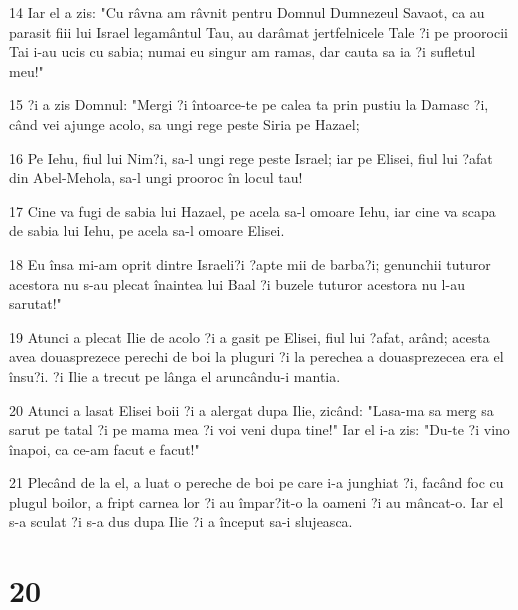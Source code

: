 \par 14 Iar el a zis: "Cu râvna am râvnit pentru Domnul Dumnezeul Savaot, ca au parasit fiii lui Israel legamântul Tau, au darâmat jertfelnicele Tale ?i pe proorocii Tai i-au ucis cu sabia; numai eu singur am ramas, dar cauta sa ia ?i sufletul meu!"
\par 15 ?i a zis Domnul: "Mergi ?i întoarce-te pe calea ta prin pustiu la Damasc ?i, când vei ajunge acolo, sa ungi rege peste Siria pe Hazael;
\par 16 Pe Iehu, fiul lui Nim?i, sa-l ungi rege peste Israel; iar pe Elisei, fiul lui ?afat din Abel-Mehola, sa-l ungi prooroc în locul tau!
\par 17 Cine va fugi de sabia lui Hazael, pe acela sa-l omoare Iehu, iar cine va scapa de sabia lui Iehu, pe acela sa-l omoare Elisei.
\par 18 Eu însa mi-am oprit dintre Israeli?i ?apte mii de barba?i; genunchii tuturor acestora nu s-au plecat înaintea lui Baal ?i buzele tuturor acestora nu l-au sarutat!"
\par 19 Atunci a plecat Ilie de acolo ?i a gasit pe Elisei, fiul lui ?afat, arând; acesta avea douasprezece perechi de boi la pluguri ?i la perechea a douasprezecea era el însu?i. ?i Ilie a trecut pe lânga el aruncându-i mantia.
\par 20 Atunci a lasat Elisei boii ?i a alergat dupa Ilie, zicând: "Lasa-ma sa merg sa sarut pe tatal ?i pe mama mea ?i voi veni dupa tine!" Iar el i-a zis: "Du-te ?i vino înapoi, ca ce-am facut e facut!"
\par 21 Plecând de la el, a luat o pereche de boi pe care i-a junghiat ?i, facând foc cu plugul boilor, a fript carnea lor ?i au împar?it-o la oameni ?i au mâncat-o. Iar el s-a sculat ?i s-a dus dupa Ilie ?i a început sa-i slujeasca.

\chapter{20}

